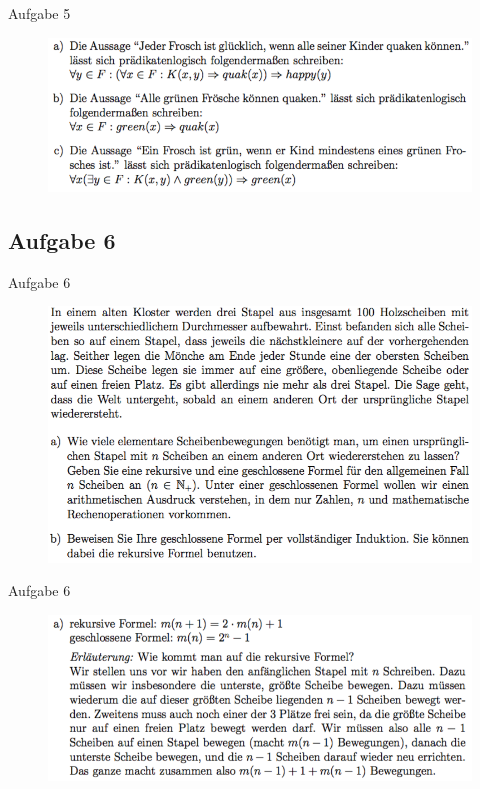 \begin{frame}{Aufgabe 5}
\begin{figure}[h!]
		\centering
		\includegraphics[width=\textwidth]{12.png} 
	\end{figure}    
\end{frame}

\subsection{Aufgabe 6}
\begin{frame}{Aufgabe 6}
\begin{figure}[h!]
		\centering
		\includegraphics[width=\textwidth]{13.png} 
	\end{figure}     
\end{frame}

\begin{frame}{Aufgabe 6}
\begin{figure}[h!]
		\centering
		\includegraphics[width=\textwidth]{14.png} 
	\end{figure}     
\end{frame}

